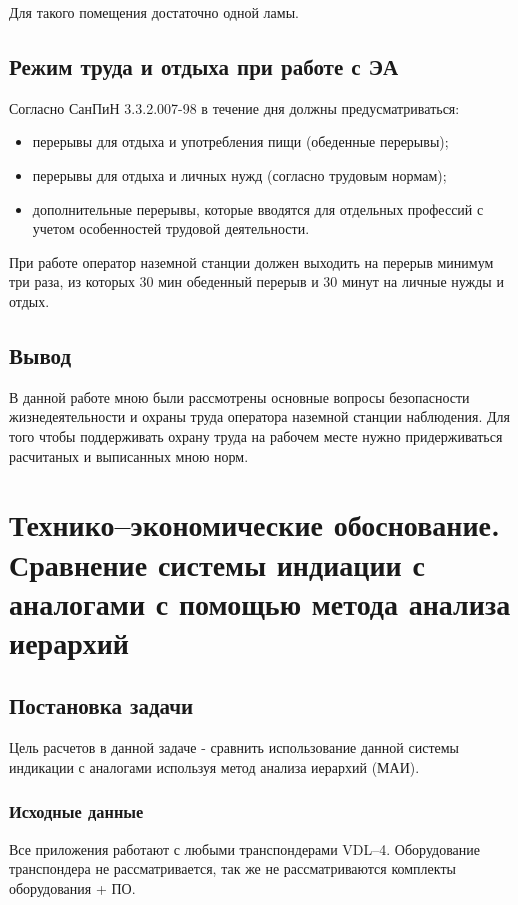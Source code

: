\documentclass[a4paper,12pt]{report} %
\begin{document}
Для такого помещения достаточно одной ламы.
\section{Режим труда и отдыха при работе с ЭА}

Согласно СанПиН 3.3.2.007-98 в течение дня должны предусматриваться:

\begin{itemize}
\item перерывы для отдыха и употребления пищи (обеденные перерывы);
\item перерывы для отдыха и личных нужд (согласно трудовым нормам);
\item дополнительные перерывы, которые вводятся для отдельных профессий с учетом особенностей трудовой деятельности.
\end{itemize}

При работе оператор наземной станции должен выходить на перерыв минимум три
раза, из которых 30 мин обеденный перерыв и 30 минут на личные нужды и отдых.

\section{Вывод}

В данной работе мною были рассмотрены основные вопросы безопасности
жизнедеятельности и охраны труда оператора наземной станции наблюдения. Для того
чтобы поддерживать охрану труда на рабочем месте нужно придерживаться расчитаных
и выписанных мною норм.
\newpage
\chapter{Технико--экономические обоснование. Сравнение системы индиации с
  аналогами с помощью метода анализа иерархий} %
\section{Постановка задачи}

Цель расчетов в данной задаче - сравнить использование данной системы индикации
с аналогами используя метод анализа иерархий (МАИ).

\subsection{Исходные данные}

Все приложения работают с любыми транспондерами VDL--4. Оборудование транспондера
не рассматривается, так же не рассматриваются комплекты оборудования + ПО.
\end{document}
